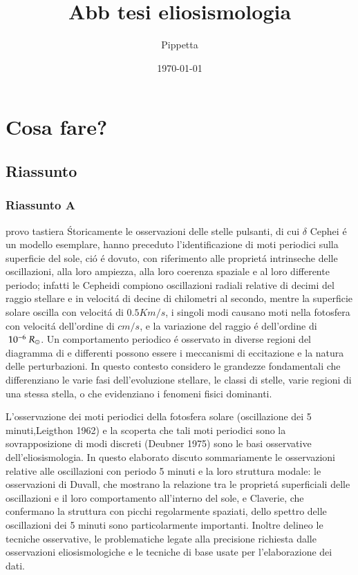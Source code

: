 \documentclass[oneside,12pt,fleqn]{memoir}
\author{Pippetta}
\title{Abb tesi eliosismologia}
\date{\today}
\begin{document}
\frontmatter


\maketitle


\tableofcontents*
\listoffigures

\mainmatter



\part{Cosa fare?}


\chapter{Riassunto}
\PartialToc

\section{Riassunto A}
provo tastiera \'
Storicamente le osservazioni delle stelle pulsanti, di cui $\delta$ Cephei \'e un modello esemplare, hanno preceduto l'identificazione di moti periodici sulla superficie del sole, ci\'o \'e dovuto, con riferimento alle propriet\'a intrinseche delle oscillazioni, alla loro ampiezza, alla loro coerenza spaziale e al loro differente periodo; infatti le Cepheidi compiono oscillazioni radiali relative di decimi del raggio stellare e in velocit\'a di decine di chilometri al secondo, mentre la superficie solare oscilla con velocit\'a di $0.5 Km/s$, i singoli modi causano moti nella fotosfera con velocit\'a dell'ordine di $cm/s$, e la variazione del raggio \'e dell'ordine di $\ 10^{-6}\ R_{\odot}$. Un comportamento periodico \'e osservato in diverse regioni del diagramma di \hr{} e differenti possono essere i meccanismi di eccitazione e la natura delle perturbazioni. In questo contesto considero le grandezze fondamentali che differenziano le varie fasi dell'evoluzione stellare, le classi di stelle, varie regioni di una stessa stella, o che evidenziano i fenomeni fisici dominanti.

L'osservazione dei moti periodici della fotosfera solare (oscillazione dei 5 minuti,Leigthon 1962) e la scoperta che tali moti periodici sono la sovrapposizione di modi discreti (Deubner 1975) sono le basi osservative dell'eliosismologia. In questo elaborato discuto sommariamente le osservazioni relative  alle oscillazioni con periodo 5 minuti e la loro struttura modale: le osservazioni di Duvall, che mostrano la relazione tra le propriet\'a superficiali delle oscillazioni e il loro comportamento all'interno del sole, e Claverie, che confermano la struttura con picchi regolarmente spaziati, dello spettro delle oscillazioni dei 5 minuti sono particolarmente importanti. Inoltre delineo le tecniche osservative, le problematiche legate alla precisione richiesta dalle osservazioni eliosismologiche e le tecniche di base usate per l'elaborazione dei dati.
\end{document}
